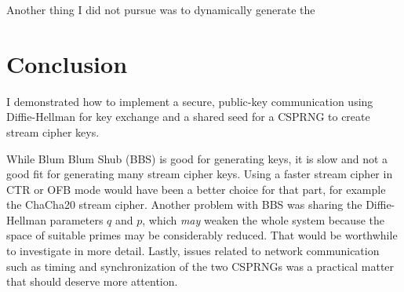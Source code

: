 \documentclass[a4paper,english,12pt]{article}
\begin{document}
Another thing I did not pursue was to dynamically generate the

\section{Conclusion}
I demonstrated how to implement a secure, public-key communication using
Diffie-Hellman for key exchange and a shared seed for a CSPRNG to create stream
cipher keys.

While Blum Blum Shub (BBS) is good for generating keys, it is slow and not a good fit
for generating many stream cipher keys. Using a faster stream cipher in CTR or
OFB mode would have been a better choice for that part, for example the
ChaCha20 \cite{chacha20} stream cipher. Another problem with BBS was sharing
the Diffie-Hellman parameters $q$ and $p$, which \textit{may} weaken the whole
system because the space of suitable primes may be considerably reduced. That
would be worthwhile to investigate in more detail. Lastly, issues related to
network communication such as timing and synchronization of the two CSPRNGs was
a practical matter that should deserve more attention.



\end{document}
